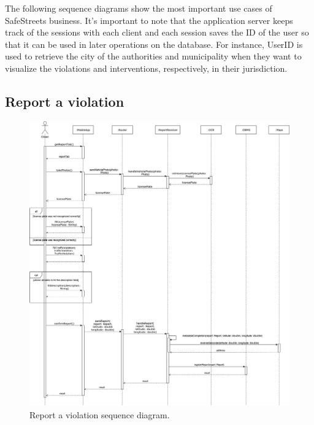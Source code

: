 The following sequence diagrams show the most important use cases of SafeStreets business. It's important to note that the application server keeps track of the sessions with each client and each session saves the ID of the user so that it can be used in later operations on the database. For instance, UserID is used to retrieve the city of the authorities and municipality when they want to visualize the violations and interventions, respectively, in their jurisdiction.
\subsection{Report a violation}
\begin{figure}[H]
	\centering
	\includegraphics[width=\linewidth]{Images/SequenceDiagramReportViolation}
	\caption{Report a violation sequence diagram.}
\end{figure}
